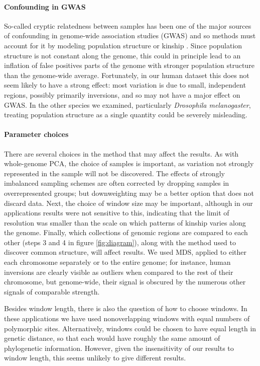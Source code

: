 \documentclass[11pt, oneside]{article}   	%
\begin{document}
\paragraph{Confounding in GWAS}
So-called cryptic relatedness between samples
has been one of the major sources of confounding in genome-wide association studies (GWAS)
and so methods must account for it by modeling population structure or kinship \citep{gwas_confounding_review,mixed_models}.
Since population structure is not constant along the genome,
this could in principle lead to an inflation of false positives parts of the genome
with stronger population structure than the genome-wide average.
Fortunately, in our human dataset this does not seem likely to have a strong effect:
most variation is due to small, independent regions, possibly primarily inversions,
and so may not have a major effect on GWAS.
In the other species we examined, particularly \textit{Drosophila melanogaster},
treating population structure as a single quantity could be severely misleading.


\paragraph{Parameter choices}
There are several choices in the method that may affect the results.
As with whole-genome PCA,
the choice of samples is important,
as variation not strongly represented in the sample will not be discovered.
The effects of strongly imbalanced sampling schemes are often corrected by dropping samples in overrepresented groups;
but downweighting may be a better option that does not discard data.
Next, the choice of window size may be important,
although in our applications results were not sensitive to this,
indicating that the limit of resolution was smaller than the scale on which patterns of kinship varies along the genome.
Finally, which collections of genomic regions are compared to each other (steps 3 and 4 in figure \ref{fig:diagram}),
along with the method used to discover common structure,
will affect results.
We used MDS, applied to either each chromosome separately or to the entire genome;
for instance, human inversions are clearly visible as outliers when compared to the rest of their chromosome,
but genome-wide, their signal is obscured by the numerous other signals of comparable strength.

Besides window length, there is also the question of how to choose windows.
In these applications we have used nonoverlapping windows with equal numbers of polymorphic sites.
Alternatively, windows could be chosen to have equal length in genetic distance,
so that each would have roughly the same amount of phylogenetic information.
However, given the insensitivity of our results to window length,
this seems unlikely to give different results.
\end{document}
